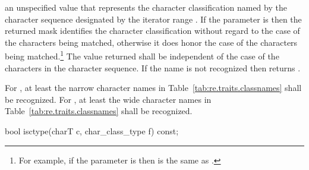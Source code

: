 \begin{itemdescr}
\pnum\returns an unspecified value that represents
the character classification named by the character sequence
designated by the iterator range .
If the parameter  is  then the returned mask identifies the
character classification without regard to the case of the characters being
matched, otherwise it does honor the case of the characters being
matched.\footnote{For example, if the parameter  is  then
\tcode{[[:lower:]]} is the same as \tcode{[[:alpha:]]}.}
The value
returned shall be independent of the case of the characters in
the character sequence. If the name
is not recognized then returns .

\pnum
\remarks  For , at least the narrow character names
in Table~\ref{tab:re.traits.classnames} shall be recognized.
For , at least the wide character names
in Table~\ref{tab:re.traits.classnames} shall be recognized.
\end{itemdescr}

%
\begin{itemdecl}
bool isctype(charT c, char_class_type f) const;
\end{itemdecl}

